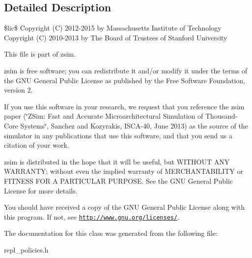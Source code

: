 \subsection{Detailed Description}
\$lic\$ Copyright (C) 2012-\/2015 by Massachusetts Institute of Technology Copyright (C) 2010-\/2013 by The Board of Trustees of Stanford University

This file is part of zsim.

zsim is free software; you can redistribute it and/or modify it under the terms of the G\-N\-U General Public License as published by the Free Software Foundation, version 2.

If you use this software in your research, we request that you reference the zsim paper (\char`\"{}\-Z\-Sim\-: Fast and Accurate Microarchitectural Simulation of
\-Thousand-\/\-Core Systems\char`\"{}, Sanchez and Kozyrakis, I\-S\-C\-A-\/40, June 2013) as the source of the simulator in any publications that use this software, and that you send us a citation of your work.

zsim is distributed in the hope that it will be useful, but W\-I\-T\-H\-O\-U\-T A\-N\-Y W\-A\-R\-R\-A\-N\-T\-Y; without even the implied warranty of M\-E\-R\-C\-H\-A\-N\-T\-A\-B\-I\-L\-I\-T\-Y or F\-I\-T\-N\-E\-S\-S F\-O\-R A P\-A\-R\-T\-I\-C\-U\-L\-A\-R P\-U\-R\-P\-O\-S\-E. See the G\-N\-U General Public License for more details.

You should have received a copy of the G\-N\-U General Public License along with this program. If not, see \href{http://www.gnu.org/licenses/}{\tt http\-://www.\-gnu.\-org/licenses/}. 

The documentation for this class was generated from the following file\-:\begin{DoxyCompactItemize}
\item 
repl\-\_\-policies.\-h\end{DoxyCompactItemize}
